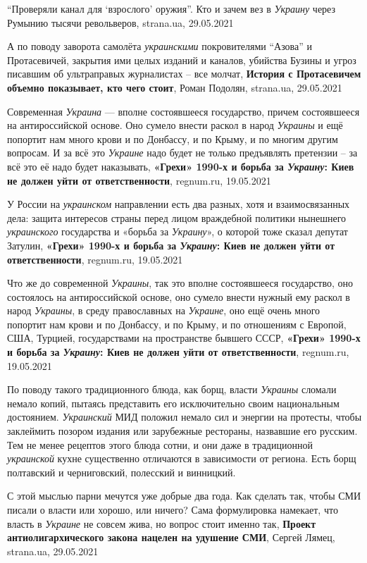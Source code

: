 \enquote{Проверяли канал для \enquote{взрослого} оружия}. Кто и зачем вез в
\emph{Украину} через Румынию тысячи револьверов, strana.ua, 29.05.2021

А по поводу заворота самолёта \emph{украинскими} покровителями \enquote{Азова}
и Протасевичей, закрытия ими целых изданий и каналов, убийства Бузины и угроз
писавшим об ультраправых журналистах -- все молчат, \textbf{История с
Протасевичем объемно показывает, кто чего стоит}, Роман Подолян, strana.ua,
29.05.2021

Современная \emph{Украина} — вполне состоявшееся государство, причем
состоявшееся на антироссийской основе. Оно сумело внести раскол в народ
\emph{Украины} и ещё попортит нам много крови и по Донбассу, и по Крыму, и по
многим другим вопросам. И за всё это \emph{Украине} надо будет не только
предъявлять претензии – за всё это её надо будет наказывать, \textbf{«Грехи»
1990-х и борьба за \emph{Украину}: Киев не должен уйти от ответственности},
regnum.ru, 19.05.2021

У России на \emph{украинском} направлении есть два разных, хотя и
взаимосвязанных дела: защита интересов страны перед лицом враждебной политики
нынешнего \emph{украинского} государства и «борьба за \emph{Украину}», о
которой тоже сказал депутат Затулин, \textbf{«Грехи» 1990-х и борьба за
\emph{Украину}: Киев не должен уйти от ответственности}, regnum.ru, 19.05.2021

Что же до современной \emph{Украины}, так это вполне состоявшееся государство,
оно состоялось на антироссийской основе, оно сумело внести нужный ему раскол в
народ \emph{Украины}, в среду православных на \emph{Украине}, оно ещё очень
много попортит нам крови и по Донбассу, и по Крыму, и по отношениям с Европой,
США, Турцией, государствами на пространстве бывшего СССР, \textbf{«Грехи»
1990-х и борьба за \emph{Украину}: Киев не должен уйти от ответственности},
regnum.ru, 19.05.2021

По поводу такого традиционного блюда, как борщ, власти \emph{Украины} сломали
немало копий, пытаясь представить его исключительно своим национальным
достоянием.  \emph{Украинский} МИД положил немало сил и энергии на протесты,
чтобы заклеймить позором издания или зарубежные рестораны, назвавшие его
русским. Тем не менее рецептов этого блюда сотни, и они даже в традиционной
\emph{украинской} кухне существенно отличаются в зависимости от региона. Есть
борщ полтавский и черниговский, полесский и винницкий.

С этой мыслью парни мечутся уже добрые два года. Как сделать так, чтобы СМИ
писали о власти или хорошо, или ничего? Сама формулировка намекает, что власть
в \emph{Украине} не совсем жива, но вопрос стоит именно так, \textbf{Проект
антиолигархического закона нацелен на удушение СМИ}, Сергей Лямец, strana.ua,
29.05.2021


